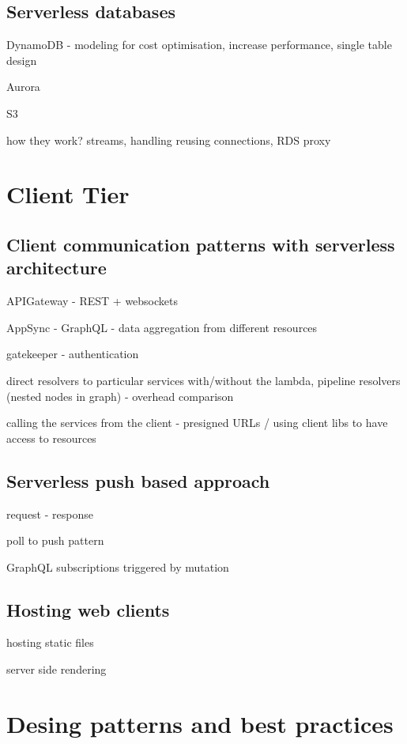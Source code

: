 \subsection{Serverless databases}

DynamoDB - modeling for cost optimisation, increase performance, single table design

Aurora

S3

how they work? streams, handling reusing connections, RDS proxy

\section{Client Tier}

\subsection{Client communication patterns with serverless architecture}

APIGateway - REST + websockets

AppSync - GraphQL - data aggregation from different resources

gatekeeper - authentication

direct resolvers to particular services with/without the lambda, pipeline resolvers (nested nodes in graph) - overhead comparison

calling the services from the client - presigned URLs / using client libs to have access to resources

\subsection{Serverless push based approach}

request - response

poll to push pattern

GraphQL subscriptions triggered by mutation

\subsection{Hosting web clients}

hosting static files

server side rendering

\section{Desing patterns and best practices}
